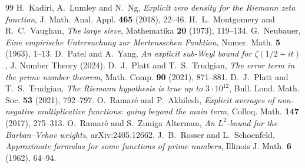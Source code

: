 \begin{thebibliography}{99}
 H.~Kadiri, A.~Lumley and N.~Ng, \emph{Explicit zero density for the Riemann zeta function}, J. Math. Anal. Appl. \textbf{465} (2018), 22--46.
 H.~L.~Montgomery and R.~C.~Vaughan, \emph{The large sieve}, Mathematika \textbf{20} (1973), 119--134.
 G.~Neubauer, \emph{Eine empirische Untersuchung zur Mertensschen Funktion}, Numer. Math. \textbf{5} (1963), 1--13.
 D.~Patel and A.~Yang, \emph{An explicit sub-Weyl bound for $\zeta(1/2+it)$}, J. Number Theory (2024).
 D.~J.~Platt and T.~S.~Trudgian, \emph{The error term in the prime number theorem}, Math. Comp. \textbf{90} (2021), 871--881.
 D.~J.~Platt and T.~S.~Trudgian, \emph{The Riemann hypothesis is true up to $3\cdot10^{12}$}, Bull. Lond. Math. Soc. \textbf{53} (2021), 792--797.
 O.~Ramar\'e and P.~Akhilesh, \emph{Explicit averages of non-negative multiplicative functions: going beyond the main term}, Colloq. Math. \textbf{147} (2017), 275--313.
 O.~Ramar\'e and S.~Zuniga Alterman, \emph{An $L^2$-bound for the Barban--Vehov weights}, arXiv:2405.12662.
 J.~B.~Rosser and L.~Schoenfeld, \emph{Approximate formulas for some functions of prime numbers}, Illinois J. Math. \textbf{6} (1962), 64--94.
\end{thebibliography}

